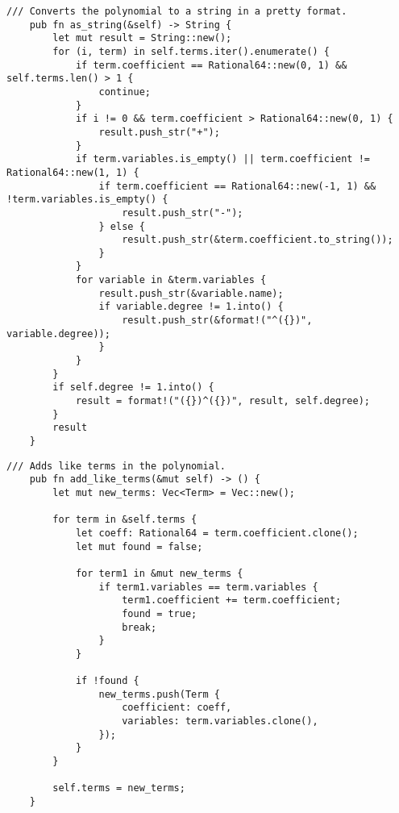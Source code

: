 \begin{lstlisting}[caption={The implementation of the \texttt{as\_string()} method for the \texttt{Polynomial} struct}, label={lst:polynomial-as-string}]
    /// Converts the polynomial to a string in a pretty format.
    pub fn as_string(&self) -> String {
        let mut result = String::new();
        for (i, term) in self.terms.iter().enumerate() {
            if term.coefficient == Rational64::new(0, 1) && self.terms.len() > 1 {
                continue;
            }
            if i != 0 && term.coefficient > Rational64::new(0, 1) {
                result.push_str("+");
            }
            if term.variables.is_empty() || term.coefficient != Rational64::new(1, 1) {
                if term.coefficient == Rational64::new(-1, 1) && !term.variables.is_empty() {
                    result.push_str("-");
                } else {
                    result.push_str(&term.coefficient.to_string());
                }
            }
            for variable in &term.variables {
                result.push_str(&variable.name);
                if variable.degree != 1.into() {
                    result.push_str(&format!("^({})", variable.degree));
                }
            }
        }
        if self.degree != 1.into() {
            result = format!("({})^({})", result, self.degree);
        }
        result
    }
\end{lstlisting}

\begin{lstlisting}[caption={The implementation of the \texttt{add\_like\_terms()} method for the \texttt{Polynomial} struct}, label={lst:polynomial-add-like-terms}]
    /// Adds like terms in the polynomial.
    pub fn add_like_terms(&mut self) -> () {
        let mut new_terms: Vec<Term> = Vec::new();

        for term in &self.terms {
            let coeff: Rational64 = term.coefficient.clone();
            let mut found = false;

            for term1 in &mut new_terms {
                if term1.variables == term.variables {
                    term1.coefficient += term.coefficient;
                    found = true;
                    break;
                }
            }

            if !found {
                new_terms.push(Term {
                    coefficient: coeff,
                    variables: term.variables.clone(),
                });
            }
        }

        self.terms = new_terms;
    }
\end{lstlisting}


